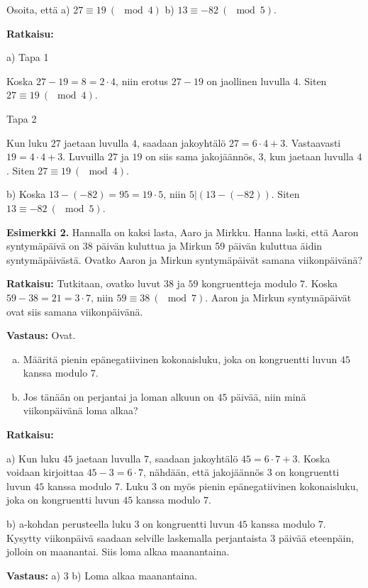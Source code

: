 \begin{esimerkki}
Osoita, että a) $27 \equiv 19 \ (\mod 4)$ b) $13 \equiv -82 \ (\mod 5)$.

{\bf Ratkaisu:}

a) Tapa 1

Koska $27 - 19 = 8 = 2\cdot 4$, niin erotus $27-19$ on jaollinen luvulla $4$. Siten $27 \equiv 19 \ (\mod 4)$.

Tapa 2

Kun luku $27$ jaetaan luvulla $4$, saadaan jakoyhtälö $27 = 6 \cdot 4 + 3$. Vastaavasti $19 = 4 \cdot 4 + 3$. Luvuilla $27$ ja $19$ on siis sama jakojäännös, $3$, kun jaetaan luvulla $4$. Siten $27 \equiv 19\ (\mod 4)$.

b) Koska $13 - (-82) = 95 = 19 \cdot 5$, niin $5 | (13 - (-82))$. Siten $13 \equiv -82 \ (\mod 5)$.


{\bf Esimerkki 2.}
Hannalla on kaksi lasta, Aaro ja Mirkku. Hanna laski, että Aaron syntymäpäivä on 38 päivän kuluttua  ja Mirkun 59 päivän kuluttua äidin syntymäpäivästä. Ovatko Aaron ja Mirkun syntymäpäivät samana viikonpäivänä?

{\bf Ratkaisu:}
Tutkitaan, ovatko luvut $38$ ja $59$ kongruentteja modulo $7$. Koska $59 - 38 = 21 = 3\cdot 7$, niin $59 \equiv 38\ (\mod 7)$. Aaron ja Mirkun syntymäpäivät ovat siis  samana viikonpäivänä.

{\bf Vastaus:} Ovat.
\end{esimerkki}

\begin{esimerkki}
\begin{enumerate}[a)]
\item Määritä pienin epänegatiivinen kokonaisluku, joka on kongruentti luvun $45$ kanssa modulo $7$.
\item Jos tänään on perjantai ja loman alkuun on $45$ päivää, niin minä viikonpäivänä loma alkaa?
\end{enumerate}

{\bf Ratkaisu:}

a)
Kun luku $45$ jaetaan luvulla $7$, saadaan jakoyhtälö $45 = 6 \cdot 7 + 3$. Koska voidaan kirjoittaa $45 - 3 = 6 \cdot 7$, nähdään, että jakojäännös $3$ on kongruentti luvun $45$ kanssa modulo 7. Luku $3$ on myös pienin epänegatiivinen kokonaisluku, joka on kongruentti luvun $45$ kanssa modulo $7$.

b)
a-kohdan perusteella luku $3$ on kongruentti luvun $45$ kanssa modulo $7$. Kysytty viikonpäivä saadaan selville laskemalla perjantaista $3$ päivää eteenpäin, jolloin on maanantai. Siis loma alkaa maanantaina. 

{\bf Vastaus:} a) 3 b) Loma alkaa maanantaina.
\end{esimerkki}


